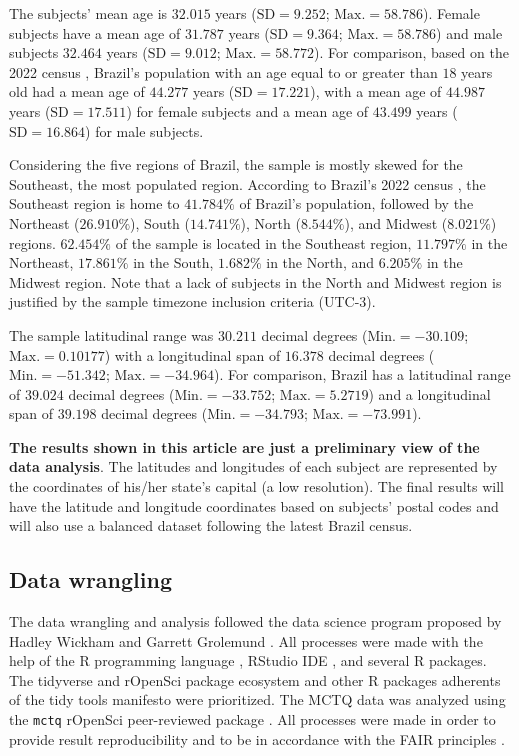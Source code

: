 \documentclass[
12pt,
openright,
oneside,
a4paper,
chapter=TITLE,
section=TITLE,
french,
spanish,
brazil,
english
]{abntex2}\usepackage{array}
\begin{document}
The subjects' mean age is \(32.015\) years (\(\text{SD} = 9.252\);
\(\text{Max.} = 58.786\)). Female subjects have a mean age of \(31.787\)
years (\(\text{SD} = 9.364\); \(\text{Max.} = 58.786\)) and male
subjects \(32.464\) years (\(\text{SD} = 9.012\);
\(\text{Max.} = 58.772\)). For comparison, based on the 2022 census
\autocite{ibgeb}, Brazil's population with an age equal to or greater
than \(18\) years old had a mean age of \(44.277\) years
(\(\text{SD} = 17.221\)), with a mean age of \(44.987\) years
(\(\text{SD} = 17.511\)) for female subjects and a mean age of
\(43.499\) years (\(\text{SD} = 16.864\)) for male subjects.

Considering the five regions of Brazil, the sample is mostly skewed for
the Southeast, the most populated region. According to Brazil's 2022
census \autocite{ibge2022}, the Southeast region is home to \(41.784\%\)
of Brazil's population, followed by the Northeast (\(26.910\%\)), South
(\(14.741\%\)), North (\(8.544\%\)), and Midwest (\(8.021\%\)) regions.
\(62.454\%\) of the sample is located in the Southeast region,
\(11.797\%\) in the Northeast, \(17.861\%\) in the South, \(1.682\%\) in
the North, and \(6.205\%\) in the Midwest region. Note that a lack of
subjects in the North and Midwest region is justified by the sample
timezone inclusion criteria (UTC-3).

The sample latitudinal range was \(30.211\) decimal degrees
(\(\text{Min.} = -30.109\); \(\text{Max.} = 0.10177\)) with a
longitudinal span of \(16.378\) decimal degrees
(\(\text{Min.} = -51.342\); \(\text{Max.} = -34.964\)). For comparison,
Brazil has a latitudinal range of \(39.024\) decimal degrees
(\(\text{Min.} = -33.752\); \(\text{Max.} = 5.2719\)) and a longitudinal
span of \(39.198\) decimal degrees (\(\text{Min.} = -34.793\);
\(\text{Max.} = -73.991\)).

\textbf{The results shown in this article are just a preliminary view of
the data analysis}. The latitudes and longitudes of each subject are
represented by the coordinates of his/her state's capital (a low
resolution). The final results will have the latitude and longitude
coordinates based on subjects' postal codes and will also use a balanced
dataset following the latest Brazil census.

\subsection{Data wrangling}\label{data-wrangling}

The data wrangling and analysis followed the data science program
proposed by Hadley Wickham and Garrett Grolemund \autocite{wickham2016}.
All processes were made with the help of the R programming language
\autocite{rcoreteam}, RStudio IDE \autocite{positteam}, and several R
packages. The tidyverse and rOpenSci package ecosystem and other R
packages adherents of the tidy tools manifesto \autocite{wickham2023a}
were prioritized. The MCTQ data was analyzed using the \texttt{mctq}
rOpenSci peer-reviewed package \autocite{vartanian2023}. All processes
were made in order to provide result reproducibility and to be in
accordance with the FAIR principles \autocite{wilkinson2016}.
\end{document}
